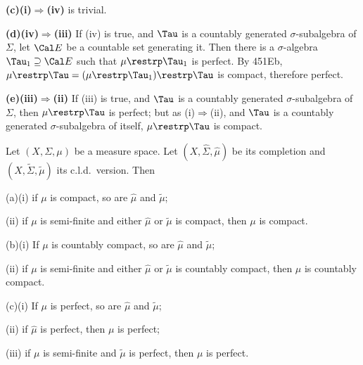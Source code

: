 {\medskip

{\bf (c)(i)$\Rightarrow$(iv)} is trivial.

\medskip

{\bf (d)(iv)$\Rightarrow$(iii)} If (iv) is true, and $\Tau$ is a
countably generated $\sigma$-subalgebra of $\Sigma$, let $\Cal E$ be a
countable set generating it.   Then there is a $\sigma$-algebra
$\Tau_1\supseteq\Cal E$ such that $\mu\restrp\Tau_1$ is perfect.
By 451Eb, $\mu\restrp\Tau=(\mu\restrp\Tau_1)\restrp\Tau$ is compact,
therefore perfect.

\medskip

{\bf (e)(iii)$\Rightarrow$(ii)} If (iii) is true, and $\Tau$ is a
countably generated $\sigma$-subalgebra of $\Sigma$, then
$\mu\restrp\Tau$ is perfect;  but as (i)$\Rightarrow$(ii), and $\Tau$ is
a countably generated $\sigma$-subalgebra of itself, $\mu\restrp\Tau$ is
compact.
}%

 Let $(X,\Sigma,\mu)$ be a
measure space.   Let $(X,\hat\Sigma,\hat\mu)$ be its completion and
$(X,\tilde\Sigma,\tilde\mu)$ its c.l.d.\ version.   Then

(a)(i) if $\mu$ is compact, so are $\hat\mu$ and $\tilde\mu$;

\quad(ii) if $\mu$ is semi-finite and either $\hat\mu$ or $\tilde\mu$ is
compact, then $\mu$ is compact.

(b)(i) If $\mu$ is countably compact, so are $\hat\mu$ and $\tilde\mu$;

\quad(ii) if $\mu$ is semi-finite and either $\hat\mu$ or $\tilde\mu$ is
countably compact, then $\mu$ is countably compact.

(c)(i) If $\mu$ is perfect, so are $\hat\mu$ and $\tilde\mu$;

\quad(ii) if $\hat\mu$ is perfect, then $\mu$ is perfect;

\quad(iii) if $\mu$ is semi-finite and $\tilde\mu$ is perfect, then
$\mu$ is perfect.

